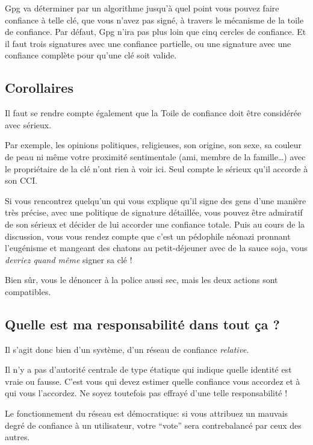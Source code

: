 Gpg va déterminer par un algorithme jusqu'à quel point vous pouvez faire
confiance à telle clé, que vous n'avez pas signé, à travers le mécanisme
de la toile de confiance. Par défaut, Gpg n'ira pas plus loin que cinq cercles de confiance. Et il
faut trois signatures avec une confiance partielle, ou une signature
avec une confiance complète pour qu'une clé soit valide.

\subsection{Corollaires}\label{corollaires}

Il faut se rendre compte également que la Toile de confiance doit être
considérée avec sérieux.

Par exemple, les opinions politiques, religieuses, son origine, son
sexe, sa couleur de peau ni même votre proximité sentimentale (ami,
membre de la famille\ldots{}) avec le propriétaire de la clé n'ont rien
à voir ici. Seul compte le sérieux qu'il accorde à son CCI.

Si vous rencontrez quelqu'un qui vous explique qu'il signe des gens
d'une manière très précise, avec une politique de signature détaillée,
vous pouvez être admiratif de son sérieux et décider de lui accorder une
confiance totale. Puis au cours de la discussion, vous vous rendez
compte que c'est un pédophile néonazi pronnant l'eugénisme et mangeant
des chatons au petit-déjeuner avec de la sauce soja, vous \emph{devriez
quand même} signer sa clé !

Bien sûr, vous le dénoncer à la police aussi sec, mais les deux actions
sont compatibles.

\subsection{Quelle est ma responsabilité dans tout ça ?}\label{quelle-est-ma-responsabilituxe9-dans-tout-uxe7a}

Il s'agit donc bien d'un système, d'un réseau de confiance \emph{relative}.

Il n'y a pas d'autorité centrale de type étatique qui indique quelle identité est vraie ou fausse. C'est vous qui devez estimer quelle confiance vous accordez et à qui vous l'accordez. Ne soyez toutefois pas effrayé d'une telle responsabilité !

Le fonctionnement du réseau est démocratique: si vous attribuez un
mauvais degré de confiance à un utilisateur, votre ``vote'' sera
contrebalancé par ceux des autres.

